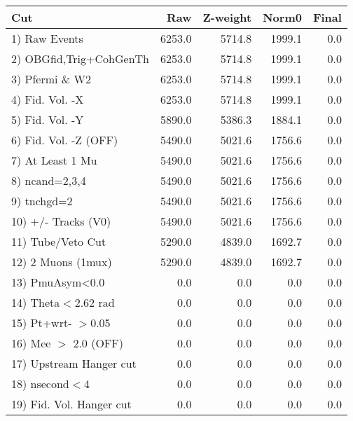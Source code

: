  \begin{table}[h!]\centering
 \begin{tabular}{||l||r|r|r|r||}
 \hline
 \hline
 Cut & Raw & Z-weight & Norm0 & Final \\
 \hline
  1) Raw Events           &      6253.0 &      5714.8 &      1999.1 &         0.0 \\
  2) OBGfid,Trig+CohGenTh &      6253.0 &      5714.8 &      1999.1 &         0.0 \\
  3) Pfermi \& W2         &      6253.0 &      5714.8 &      1999.1 &         0.0 \\
  4) Fid. Vol. -X         &      6253.0 &      5714.8 &      1999.1 &         0.0 \\
  5) Fid. Vol. -Y         &      5890.0 &      5386.3 &      1884.1 &         0.0 \\
  6) Fid. Vol. -Z (OFF)   &      5490.0 &      5021.6 &      1756.6 &         0.0 \\
  7) At Least 1 Mu        &      5490.0 &      5021.6 &      1756.6 &         0.0 \\
  8) ncand=2,3,4          &      5490.0 &      5021.6 &      1756.6 &         0.0 \\
  9) tnchgd=2             &      5490.0 &      5021.6 &      1756.6 &         0.0 \\
 10) +/- Tracks (V0)      &      5490.0 &      5021.6 &      1756.6 &         0.0 \\
 11) Tube/Veto Cut        &      5290.0 &      4839.0 &      1692.7 &         0.0 \\
 12) 2 Muons (1mux)       &      5290.0 &      4839.0 &      1692.7 &         0.0 \\
 13) PmuAsym<0.0          &         0.0 &         0.0 &         0.0 &         0.0 \\
 14) Theta$<$2.62 rad     &         0.0 &         0.0 &         0.0 &         0.0 \\
 15) Pt+wrt- $>$0.05      &         0.0 &         0.0 &         0.0 &         0.0 \\
 16) Mee $>$ 2.0  (OFF)   &         0.0 &         0.0 &         0.0 &         0.0 \\
 17) Upstream Hanger cut  &         0.0 &         0.0 &         0.0 &         0.0 \\
 18) nsecond$<$4          &         0.0 &         0.0 &         0.0 &         0.0 \\
 19) Fid. Vol. Hanger cut &         0.0 &         0.0 &         0.0 &         0.0 \\

\end{tabular}
\end{table}
